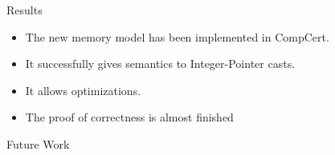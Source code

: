 \begin{frame}{\secname}

  \begin{exampleblock}{Results}
    \begin{itemize}
    \item The new memory model has been implemented in CompCert.
    \item It successfully gives semantics to Integer-Pointer casts.
    \item It allows optimizations.
    \item The proof of correctness is almost finished
    \end{itemize}
  \end{exampleblock}
  \vfill
  \begin{block}{Future Work}
  \end{block}
  
\end{frame}

